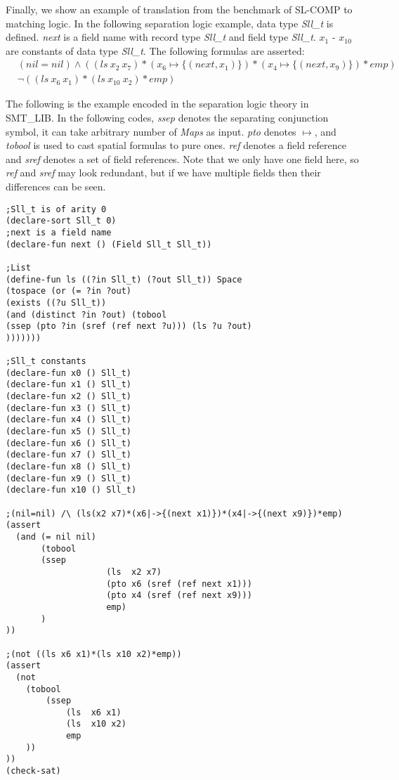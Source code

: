 \documentclass{article}
\theoremstyle{plain}
\begin{document}
Finally, we show an example of translation from the benchmark of SL-COMP to matching logic. In the following separation logic example, data type \textit{Sll\_t} is defined.  \textit{next} is a field name with record type \textit{Sll\_t} and field type \textit{Sll\_t}. $x_1$ - $x_{10}$ are constants of data type \textit{Sll\_t}. The following formulas are asserted:
\begin{equation*}
\begin{split}
&(\mathit{nil} = \mathit{nil}) \wedge ((\mathit{ls}\ x_2\ x_7) * (x_6 \mapsto \{(\mathit{next},x_1)\}) * (x_4 \mapsto \{(\mathit{next},x_9)\}) *\mathit{emp}) \\  &\neg((\mathit{ls}\ x_6\ x_1) *(\mathit{ls}\ x_{10}\ x_2) *\mathit{emp})
\end{split}
\end{equation*}

The following is the example encoded in the separation logic theory in SMT\_LIB. In the following codes, \textit{ssep} denotes the separating conjunction symbol, it can take arbitrary number of \textit{Maps} as input. \textit{pto} denotes $\mapsto$, and \textit{tobool} is used to cast spatial formulas to pure ones. \textit{ref} denotes a field reference and \textit{sref} denotes a set of field references. Note that we only have one field here, so \textit{ref} and \textit{sref} may look redundant, but if we have multiple fields then their differences can be seen.
\begin{verbatim}
;Sll_t is of arity 0
(declare-sort Sll_t 0)
;next is a field name
(declare-fun next () (Field Sll_t Sll_t))

;List
(define-fun ls ((?in Sll_t) (?out Sll_t)) Space
(tospace (or (= ?in ?out)
(exists ((?u Sll_t))
(and (distinct ?in ?out) (tobool
(ssep (pto ?in (sref (ref next ?u))) (ls ?u ?out)
)))))))

;Sll_t constants
(declare-fun x0 () Sll_t)
(declare-fun x1 () Sll_t)
(declare-fun x2 () Sll_t)
(declare-fun x3 () Sll_t)
(declare-fun x4 () Sll_t)
(declare-fun x5 () Sll_t)
(declare-fun x6 () Sll_t)
(declare-fun x7 () Sll_t)
(declare-fun x8 () Sll_t)
(declare-fun x9 () Sll_t)
(declare-fun x10 () Sll_t)

;(nil=nil) /\ (ls(x2 x7)*(x6|->{(next x1)})*(x4|->{(next x9)})*emp) 
(assert
  (and (= nil nil)
       (tobool 
       (ssep
		            (ls  x2 x7) 
		            (pto x6 (sref (ref next x1))) 
		            (pto x4 (sref (ref next x9))) 
		            emp)
	   )  
))

;(not ((ls x6 x1)*(ls x10 x2)*emp))
(assert
  (not
    (tobool 
	    (ssep
       		(ls  x6 x1) 
       		(ls  x10 x2) 
       		emp
	))
))
(check-sat)

\end{verbatim}
\end{document}

